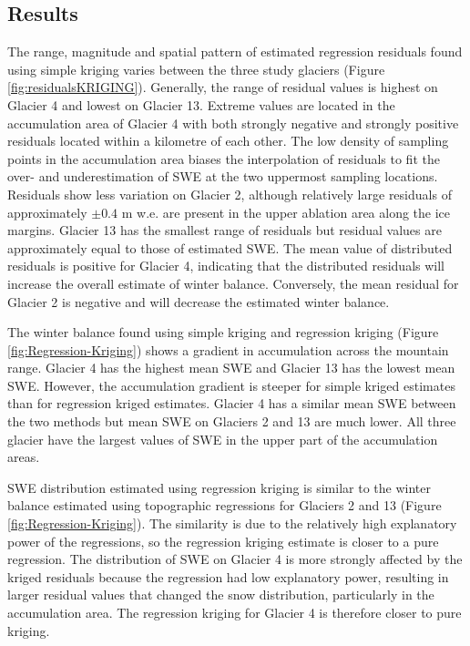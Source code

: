 \documentclass{sfuthesis}
\begin{document}
\subsection{Results}

The range, magnitude and spatial pattern of estimated regression residuals found using simple kriging varies between the three study glaciers (Figure \ref{fig:residualsKRIGING}). Generally, the range of residual values is highest on Glacier 4 and lowest on Glacier 13. Extreme values are located in the accumulation area of Glacier 4 with both strongly negative and strongly positive residuals located within a kilometre of each other. The low density of sampling points in the accumulation area biases the interpolation of residuals to fit the over- and underestimation of SWE at the two uppermost sampling locations. Residuals show less variation on Glacier 2, although relatively large residuals of approximately $\pm 0.4$ m w.e. are present in the upper ablation area along the ice margins. Glacier 13 has the smallest range of residuals but residual values are approximately equal to those of estimated SWE. The mean value of distributed residuals is positive for Glacier 4, indicating that the distributed residuals will increase the overall estimate of winter balance. Conversely, the mean residual for Glacier 2 is negative and will decrease the estimated winter balance. 

The winter balance found using simple kriging and regression kriging (Figure \ref{fig:Regression-Kriging}) shows a gradient in accumulation across the mountain range. Glacier 4 has the highest mean SWE and Glacier 13 has the lowest mean SWE. However, the accumulation gradient is steeper for simple kriged estimates than for regression kriged estimates. Glacier 4 has a similar mean SWE between the two methods but mean SWE on Glaciers 2 and 13 are much lower. All three glacier have the largest values of SWE in the upper part of the accumulation areas. 

SWE distribution estimated using regression kriging is similar to the winter balance estimated using topographic regressions for Glaciers 2 and 13 (Figure \ref{fig:Regression-Kriging}). The similarity is due to the relatively high explanatory power of the regressions, so the regression kriging estimate is closer to a pure regression. The distribution of SWE on Glacier 4 is more strongly affected by the kriged residuals because the regression had low explanatory power, resulting in larger residual values that changed the snow distribution, particularly in the accumulation area. The regression kriging for Glacier 4 is therefore closer to pure kriging.
\end{document}

